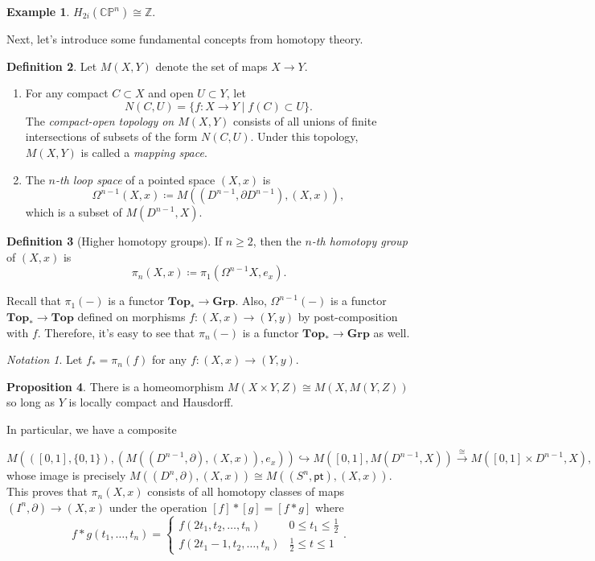 \documentclass[10pt,letterpaper,cm]{nupset}
\theoremstyle{definition}
\newtheorem{defn}{Definition}[subsection]
\newtheorem{exmp}[defn]{Example}
\theoremstyle{theorem}
\newtheorem{prop}[defn]{Proposition}
\theoremstyle{remark}
\newtheorem*{notation}{Notation}
\newcommand{\CP}{\mathbb{CP}}
\newcommand{\Z}{\mathbb Z}
\newcommand{\1}{\mathbb{1}}
\newcommand{\0}{\vec 0}
\newcommand{\pt}{\mathsf{pt}}
\newcommand{\be}{\begin{enumerate}}
\newcommand{\ee}{\end{enumerate}}
\begin{document}
\smallskip

\begin{exmp}
$H_{2i}(\CP^n) \cong \Z$.
\end{exmp}

\bigskip

Next, let's introduce some fundamental concepts from homotopy theory. 

\begin{defn} Let $M(X, Y)$ denote the set of maps $X \to Y$. 
\be
\item For any compact $C \subset X$ and open $U \subset Y$, let $$N(C, U) = \{f : X \to Y \mid f(C) \subset U \}  .$$ The \textit{compact-open topology on $M(X, Y)$} consists of all unions of finite intersections of subsets of the form $N(C, U)$. Under this topology, $M(X,Y)$ is called a \textit{mapping space}. 
\item The \textit{$n$-th loop space} of a pointed space $(X, x)$ is $$\Omega^{n-1}(X, x) \coloneqq M((D^{n-1}, \partial{D^{n-1}}), (X, x)),$$  which is a subset of $M(D^{n-1}, X)$.
\ee 
\end{defn}


\begin{defn}[Higher homotopy groups]
If $n \geq 2$, then the \textit{$n$-th homotopy group} of $(X, x)$ is $$\pi_n(X,x) \coloneqq \pi_1(\Omega^{n-1}{X}, e_x).$$
\end{defn}

Recall that $\pi_1({-})$ is a functor $\mathbf{Top}_{\ast} \to \mathbf{Grp}$. Also, $\Omega^{n-1}({-})$ is a functor $\mathbf{Top}_{\ast}  \to \mathbf{Top} $ defined on morphisms $f: (X, x) \to (Y, y)$ by post-composition with $f$.
 Therefore, it's easy to see that $\pi_n({-})$ is a functor $\mathbf{Top}_{\ast} \to \mathbf{Grp}$ as well.

\begin{notation} 
Let $f_{\ast} =  \pi_n(f)$ for any $f: (X, x) \to (Y, y)$.
\end{notation}

\begin{prop}
There is a homeomorphism $M(X \times Y, Z) \cong M(X, M(Y, Z))$ so long as $Y$ is locally compact and Hausdorff. 
\end{prop}

In particular, we have a composite 

\[
M(([0,1], \{0,1\}), (M((D^{n-1}, \partial), (X,x)), e_x)) \hookrightarrow M([0,1], M(D^{n-1}, X)) \overset{\cong}{\longrightarrow} M([0,1] \times D^{n-1}, X),
\] whose image is precisely $M((D^n, \partial), (X,x)) \cong M((S^n, \pt), (X,x))$. This proves that $\pi_n(X,x)$ consists of all homotopy classes of maps $\left(I^n, \partial\right) \to \left(X,x\right)$ under the operation $[f] \ast [g] = [f \ast g]$ where $$ f \ast g(t_1, \ldots, t_n) = \begin{cases}
      f(2t_1, t_2, \ldots, t_n) & 0\leq t_1 \leq \frac{1}{2}
      \\ f(2t_1-1, t_2, \ldots, t_n) & \frac{1}{2} \leq t\leq 1
\end{cases}    .$$ 
\end{document}
